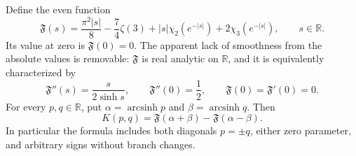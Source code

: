 \begin{theorem}
\label{xid:wat:thm:main}
Define the even function
\begin{equation}\label{xid:wat:eq:Fclosed}
 \mathfrak F(s)=\frac{\pi^2|s|}{8}-\frac74\zeta(3)
    +|s|\chi_2(e^{-|s|})+2\chi_3(e^{-|s|}),
 \qquad s\in\mathbb R.
\end{equation}
Its value at zero is $\mathfrak F(0)=0$. The apparent lack of
smoothness from the absolute values is removable: $\mathfrak F$ is
real analytic on $\mathbb R$, and it is equivalently characterized by
\begin{equation}\label{xid:wat:eq:Fode}
 \mathfrak F''(s)=\frac{s}{2\sinh s},\qquad
 \mathfrak F''(0)=\frac12,\qquad
 \mathfrak F(0)=\mathfrak F'(0)=0.
\end{equation}
For every $p,q\in\mathbb R$, put
$\alpha=\operatorname{arcsinh}p$ and
$\beta=\operatorname{arcsinh}q$. Then
\begin{equation}\label{xid:wat:eq:main}
 \boxed{\displaystyle
 K(p,q)=\mathfrak F(\alpha+\beta)-\mathfrak F(\alpha-\beta).}
\end{equation}
In particular the formula includes both diagonals $p=\pm q$,
either zero parameter, and arbitrary signs without branch changes.
\end{theorem}

